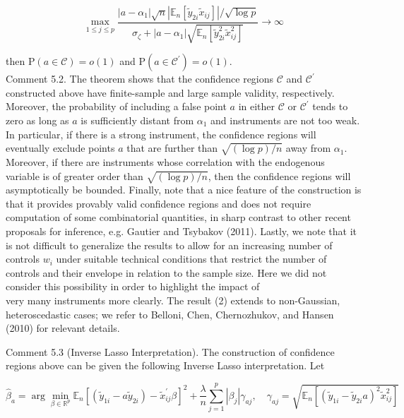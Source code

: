 \documentclass[10pt]{article}
\begin{document}
\[
\max _{1 \leqslant j \leqslant p} \frac{\left|a-\alpha_{1}\right| \sqrt{n}\left|\mathbb{E}_{n}\left[\tilde{y}_{2 i} \tilde{x}_{i j}\right]\right| / \sqrt{\log p}}{\sigma_{\zeta}+\left|a-\alpha_{1}\right| \sqrt{\mathbb{E}_{n}\left[\tilde{y}_{2 i}^{2} \tilde{x}_{i j}^{2}\right]}} \rightarrow \infty
\]

then \(\mathrm{P}(a \in \mathcal{C})=o(1)\) and \(\mathrm{P}\left(a \in \mathcal{C}^{\prime}\right)=o(1)\).\\
Comment 5.2. The theorem shows that the confidence regions \(\mathcal{C}\) and \(\mathcal{C}^{\prime}\) constructed above have finite-sample and large sample validity, respectively. Moreover, the probability of including a false point \(a\) in either \(\mathcal{C}\) or \(\mathcal{C}^{\prime}\) tends to zero as long as \(a\) is sufficiently distant from \(\alpha_{1}\) and instruments are not too weak. In particular, if there is a strong instrument, the confidence regions will eventually exclude points \(a\) that are further than \(\sqrt{(\log p) / n}\) away from \(\alpha_{1}\). Moreover, if there are instruments whose correlation with the endogenous variable is of greater order than \(\sqrt{(\log p) / n}\), then the confidence regions will asymptotically be bounded. Finally, note that a nice feature of the construction is that it provides provably valid confidence regions and does not require computation of some combinatorial quantities, in sharp contrast to other recent proposals for inference, e.g. Gautier and Tsybakov (2011). Lastly, we note that it is not difficult to generalize the results to allow for an increasing number of controls \(w_{i}\) under suitable technical conditions that restrict the number of controls and their envelope in relation to the sample size. Here we did not consider this possibility in order to highlight the impact of\\
very many instruments more clearly. The result (2) extends to non-Gaussian, heteroscedastic cases; we refer to Belloni, Chen, Chernozhukov, and Hansen (2010) for relevant details.

Comment 5.3 (Inverse Lasso Interpretation). The construction of confidence regions above can be given the following Inverse Lasso interpretation. Let

\[
\widehat{\beta}_{a}=\arg \min _{\beta \in \mathbb{R}^{p}} \mathbb{E}_{n}\left[\left(\tilde{y}_{1 i}-a \tilde{y}_{2 i}\right)-\tilde{x}_{i j}^{\prime} \beta\right]^{2}+\frac{\lambda}{n} \sum_{j=1}^{p}\left|\beta_{j}\right| \gamma_{a j}, \quad \gamma_{a j}=\sqrt{\mathbb{E}_{n}\left[\left(\tilde{y}_{1 i}-\tilde{y}_{2 i} a\right)^{2} \tilde{x}_{i j}^{2}\right]}
\]
\end{document}
